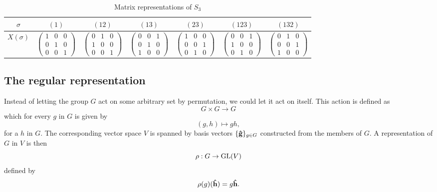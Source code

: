 \begin{example}[$S_n$ for $n = 2,3$]
			\begin{table}[hbt!]
				\centering
				\caption{Matrix representations of $S_3$}
				\begin{tabular}{c | c c c c c c}
					$\sigma$  &$(1)$& $(12)$&$(13)$&$(23)$&$(123)$&$(132)$ \\
					\hline
					$X(\sigma)$ & 
					$\left(\begin{smallmatrix}
						1 & 0 & 0 \\
						0 & 1 & 0 \\
						0 & 0 & 1
					\end{smallmatrix}\right)$ &
					$\left(\begin{smallmatrix}
						0 & 1 & 0 \\
						1 & 0 & 0 \\
						0 & 0 & 1
					\end{smallmatrix}\right)$ &
					$\left(\begin{smallmatrix}
						0 & 0 & 1 \\
						0 & 1 & 0 \\
						1 & 0 & 0
					\end{smallmatrix}\right)$ &
					$\left(\begin{smallmatrix}
						1 & 0 & 0 \\
						0 & 0 & 1 \\
						0 & 1 & 0
					\end{smallmatrix}\right)$ &
					$\left(\begin{smallmatrix}
						0 & 0 & 1 \\
						1 & 0 & 0 \\
						0 & 1 & 0
					\end{smallmatrix}\right)$ &
					$\left(\begin{smallmatrix}
						0 & 1 & 0 \\
						0 & 0 & 1 \\
						1 & 0 & 0
					\end{smallmatrix}\right)$
				\end{tabular}
			\end{table}
			
		\end{example}
		
	\subsection{The regular representation}
	
	Instead of letting the group $G$ act on some arbitrary set by permutation, we could let it act on itself. This action is defined as
	\[
		G \times G \rightarrow G
	\]
	which for every $g$ in $G$ is given by 
	\[
		(g,h) \mapsto gh,
	\]
	for a $h$ in $G$. The corresponding vector space $V$ is spanned by basis vectors $\{\mathbf{\hat{g}}\}_{g \in G}$ constructed from the members of $G$. A representation of $G$ in $V$ is then
	\[
		\rho: G \rightarrow \text{GL}(V)
	\]
	defined by
	\[
		\rho(g)(\mathbf{\hat{h}}) = g\mathbf{\hat{h}}.
	\]